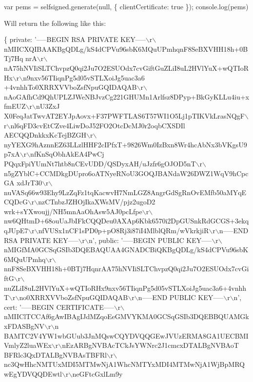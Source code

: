 \begin{DoxyCode}
var pems = selfsigned.generate(null, \{ clientCertificate: true \});
console.log(pems)
\end{DoxyCode}
 Will return the following like this\+:


\begin{DoxyCode}
\{ private: '-----BEGIN RSA PRIVATE
       KEY-----\(\backslash\)r\(\backslash\)nMIICXQIBAAKBgQDLg/kS4dCPVu96sbK6MQuUPmhqnF8SeBXVHH18h+0BTj7Hq
      nrA\(\backslash\)r\(\backslash\)nA75hNVIiSLTChvpzQ0qi2Ju7O2ESUOdx7cvGiftGuZLiI8uL2HVlYuX+wQTIoRHx\(\backslash\)r\(\backslash\)n9nxv56TIiqnPg5d05vSTLXoiJg5uac3a6
      +4vnhhTo0XRRXVVboZsfNpuGQIDAQAB\(\backslash\)r\(\backslash\)nAoGAfhCd9QhUPLZJWeNBJvzCg221GHUMn1Arlfsz8DPyp+BkGyKLLu4iu+xfmEUZ\(\backslash\)r\(\backslash\)nU3ZxJ
      X0FeqJatTwvAT2EYJpAovx+F37PWFTLAS6T57WI1O5Lj1pTIKVkLrasNQgF\(\backslash\)r\(\backslash\)nl6qFD3cvEtCZve4LiwDoJ52FO2OtcDcMJ0r2oqbCXSDIl
      AECQQDnkkxKcTejBZGH\(\backslash\)r\(\backslash\)nyYEXG9hAznnEZ63LLzlHHF2cIPfxT+9826Wm0IzBxn8Wr4hcAbNx3bVKgsU9p7xA\(\backslash\)r\(\backslash\)nfKnSqObhAkEA4PwCj
      PQqxFpiYUmNt7htb8nCEvUDD/QSDyxAH/uJzfr6gOJOD5nT\(\backslash\)r\(\backslash\)n5gZYblC+CCMDkgDUpro6oATNyeRNoU3GOQJBANdaW26DWZ1WqV9hCpcGA
      xdJrT30\(\backslash\)r\(\backslash\)nuVASq66w93Ehy9LzZqFz1tqKacwvH7NmLGZ8AngrGdSgRnOvEMfb50aMYqECQDcG\(\backslash\)r\(\backslash\)nzCTnbzJZHOjIkaXWsMV/pjz2ugoD2
      wrk+sYXwoujj/NH5mnAaOhAsw5AJ0pcLfpe\(\backslash\)r\(\backslash\)nw6QHtmD+68ouUaJbIFkCQQDeu0AXAp6Kbk6570i2DpGUSnkRdGCGS+3ekqqJUpE7\(\backslash\)r\(\backslash\)nfVUSx1nCF1sPD0p+pO8Rj3i87iI4MlblQRm/wVkrkjiR\(\backslash\)r\(\backslash\)n-----END RSA PRIVATE KEY-----\(\backslash\)r\(\backslash\)n',
  public: '-----BEGIN PUBLIC
       KEY-----\(\backslash\)r\(\backslash\)nMIGfMA0GCSqGSIb3DQEBAQUAA4GNADCBiQKBgQDLg/kS4dCPVu96sbK6MQuUPmhq\(\backslash\)r\(\backslash\)
      nnF8SeBXVHH18h+0BTj7HqnrAA75hNVIiSLTChvpzQ0qi2Ju7O2ESUOdx7cvGiftG\(\backslash\)r\(\backslash\)nuZLiI8uL2HVlYuX+wQTIoRHx9nxv56TIiqnPg5d05vSTLXoiJg5uac3a6+4vnhhT\(\backslash\)r\(\backslash\)no0XRRXVVboZsfNpuGQIDAQAB\(\backslash\)r\(\backslash\)n-----END PUBLIC KEY-----\(\backslash\)r\(\backslash\)n',
  cert: '-----BEGIN
       CERTIFICATE-----\(\backslash\)r\(\backslash\)nMIIClTCCAf6gAwIBAgIJdMZqoEeGMVYKMA0GCSqGSIb3DQEBBQUAMGkxFDASBgNV\(\backslash\)r\(\backslash\)n
      BAMTC2V4YW1wbGUub3JnMQswCQYDVQQGEwJVUzERMA8GA1UECBMIVmlyZ2luaWEx\(\backslash\)r\(\backslash\)nEzARBgNVBAcTCkJsYWNrc2J1cmcxDTALBgNVBAoT
      BFRlc3QxDTALBgNVBAsTBFRl\(\backslash\)r\(\backslash\)nc3QwHhcNMTUxMDI5MTMwNjA1WhcNMTYxMDI4MTMwNjA1WjBpMRQwEgYDVQQDEwtl\(\backslash\)r\(\backslash\)neGFtcGxlLm9y

\end{DoxyCode}

